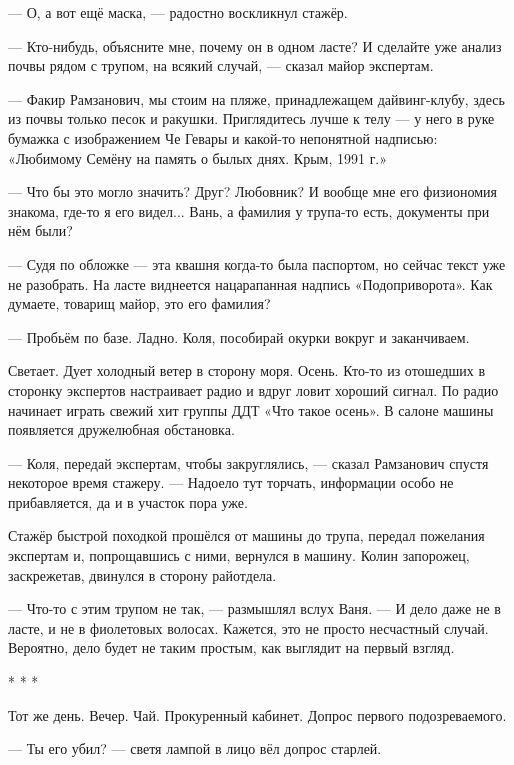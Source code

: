 --- О, а вот ещё маска, --- радостно воскликнул стажёр.

--- Кто-нибудь, объясните мне, почему он в одном ласте? И сделайте уже анализ почвы рядом с трупом, на всякий случай, --- сказал майор экспертам.

--- Факир Рамзанович, мы стоим на пляже, принадлежащем дайвинг-клубу, здесь из почвы только песок и ракушки. Приглядитесь лучше к телу --- у него в руке бумажка с изображением Че Гевары и какой-то непонятной надписью: «Любимому Семёну на память о былых днях. Крым, 1991 г.»

--- Что бы это могло значить? Друг? Любовник? И вообще мне его физиономия знакома, где-то я его видел... Вань, а фамилия у трупа-то есть, документы при нём были?

--- Судя по обложке --- эта квашня когда-то была паспортом, но сейчас текст уже не разобрать. На ласте виднеется нацарапанная надпись «Подоприворота». Как думаете, товарищ майор, это его фамилия?

--- Пробьём по базе. Ладно. Коля, пособирай окурки вокруг и заканчиваем.


Светает. Дует холодный ветер в сторону моря. Осень. Кто-то из отошедших в сторонку экспертов настраивает радио и вдруг ловит хороший сигнал. По радио начинает играть свежий хит группы ДДТ «Что такое осень». В салоне машины появляется дружелюбная обстановка.



--- Коля, передай экспертам, чтобы закруглялись, --- сказал Рамзанович спустя некоторое время стажеру. --- Надоело тут торчать, информации особо не прибавляется, да и в участок пора уже.


Стажёр быстрой походкой прошёлся от машины до трупа, передал пожелания экспертам и, попрощавшись с ними, вернулся в машину. Колин запорожец, заскрежетав, двинулся в сторону райотдела.



--- Что-то с этим трупом не так, --- размышлял вслух Ваня. --- И дело даже не в ласте, и не в фиолетовых волосах. Кажется, это не просто несчастный случай. Вероятно, дело будет не таким простым, как выглядит на первый взгляд.


\begin{center}* * *\end{center}


Тот же день. Вечер. Чай. Прокуренный кабинет. Допрос первого подозреваемого.



--- Ты его убил? --- светя лампой в лицо вёл допрос старлей.

